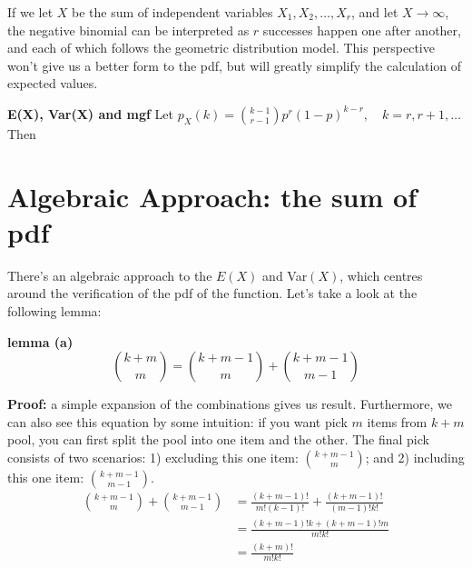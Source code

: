 \documentclass[11pt]{article}
\begin{document}
If we let $X$ be the sum of independent variables $X_1,  X_2,   \dots,   X_r$,  and let $X \to \infty$,  the negative binomial can be interpreted as $r$ successes happen one after another,  and each of which follows the geometric distribution model.  This perspective won't give us a better form to the pdf,  but will greatly simplify the calculation of expected values. 


\begin{tcolorbox}[
	enhanced, 
	width=\textwidth, 
	fontupper=\normalsize,%
	drop fuzzy shadow southwest,
	boxrule=0.4pt,
	sharp corners,
	colframe=yellow!80!black,
	colback=yellow!10]
	
\textbf{\color{RoyalBlue} E(X), Var(X) and mgf} \qquad Let $ \displaystyle p_X (k) = \binom {k-1}{r-1} p^r (1-p)^{k-r},  \quad k=r, r+1, \dots$ Then 

\end{tcolorbox}




\section*{\normalsize Algebraic Approach: the sum of pdf}

There's an algebraic approach to the $E(X)$ and Var$(X)$, which centres around the verification of the pdf of the function.  Let's take a look at the following lemma:

\begin{tcolorbox}[
	enhanced, 
	width=\textwidth, 
	fontupper=\normalsize,%
	drop fuzzy shadow southwest,
	boxrule=0.4pt,
	sharp corners,
	colframe=yellow!80!black,
	colback=yellow!10]
	
\textbf{\color{RoyalBlue} lemma (a)} 
\[ 
\binom {k+m}{m} = \binom {k+m-1}{m} + \binom {k+m-1}{m-1}
\]

\end{tcolorbox}

\textbf{Proof:} a simple expansion of the combinations gives us result.  Furthermore,  we can also see this equation by some intuition: if you want pick $m$ items from $k+m$ pool,  you can first split the pool into one item and the other.  The final pick consists of two scenarios: 1) excluding this one item: $\displaystyle \binom {k+m-1}{m}$; and 2) including this one item: $\displaystyle \binom {k+m-1}{m-1}$. 
\[
\begin{aligned}
\binom {k+m-1}{m} + \binom {k+m-1}{m-1} 
	&= \frac{(k+m-1)!}{m! (k-1)!} + \frac{(k+m-1)!}{(m-1)! k!} \\
	&= \frac{(k+m-1)! k + (k+m-1)! m}{m! k!} \\
	&= \frac{(k+m)!}{m!k!}
\end{aligned}
\]
\end{document}
